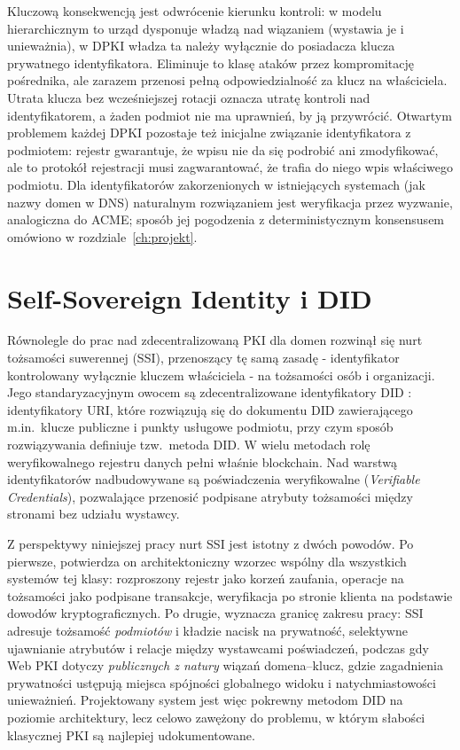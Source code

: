 Kluczową konsekwencją jest odwrócenie kierunku kontroli: w modelu hierarchicznym to urząd dysponuje władzą nad wiązaniem (wystawia je i unieważnia), w DPKI władza ta należy wyłącznie do posiadacza klucza prywatnego identyfikatora. Eliminuje to klasę ataków przez kompromitację pośrednika, ale zarazem przenosi pełną odpowiedzialność za klucz na właściciela. Utrata klucza bez wcześniejszej rotacji oznacza utratę kontroli nad identyfikatorem, a żaden podmiot nie ma uprawnień, by ją przywrócić. Otwartym problemem każdej DPKI pozostaje też inicjalne związanie identyfikatora z podmiotem: rejestr gwarantuje, że wpisu nie da się podrobić ani zmodyfikować, ale to protokół rejestracji musi zagwarantować, że trafia do niego wpis właściwego podmiotu. Dla identyfikatorów zakorzenionych w istniejących systemach (jak nazwy domen w DNS) naturalnym rozwiązaniem jest weryfikacja przez wyzwanie, analogiczna do ACME; sposób jej pogodzenia z deterministycznym konsensusem omówiono w rozdziale~\ref{ch:projekt}.

\section{Self-Sovereign Identity i DID}
\label{sec:ssi-did}

Równolegle do prac nad zdecentralizowaną PKI dla domen rozwinął się nurt tożsamości suwerennej (SSI), przenoszący tę samą zasadę - identyfikator kontrolowany wyłącznie kluczem właściciela - na tożsamości osób i organizacji. Jego standaryzacyjnym owocem są zdecentralizowane identyfikatory DID \cite{w3c-did-core}: identyfikatory URI, które rozwiązują się do dokumentu DID zawierającego m.in.\ klucze publiczne i punkty usługowe podmiotu, przy czym sposób rozwiązywania definiuje tzw.\ metoda DID. W wielu metodach rolę weryfikowalnego rejestru danych pełni właśnie blockchain. Nad warstwą identyfikatorów nadbudowywane są poświadczenia weryfikowalne (\emph{Verifiable Credentials}), pozwalające przenosić podpisane atrybuty tożsamości między stronami bez udziału wystawcy.

Z perspektywy niniejszej pracy nurt SSI jest istotny z dwóch powodów. Po pierwsze, potwierdza on architektoniczny wzorzec wspólny dla wszystkich systemów tej klasy: rozproszony rejestr jako korzeń zaufania, operacje na tożsamości jako podpisane transakcje, weryfikacja po stronie klienta na podstawie dowodów kryptograficznych. Po drugie, wyznacza granicę zakresu pracy: SSI adresuje tożsamość \emph{podmiotów} i kładzie nacisk na prywatność, selektywne ujawnianie atrybutów i relacje między wystawcami poświadczeń, podczas gdy Web PKI dotyczy \emph{publicznych z natury} wiązań domena--klucz, gdzie zagadnienia prywatności ustępują miejsca spójności globalnego widoku i natychmiastowości unieważnień. Projektowany system jest więc pokrewny metodom DID na poziomie architektury, lecz celowo zawężony do problemu, w którym słabości klasycznej PKI są najlepiej udokumentowane.


